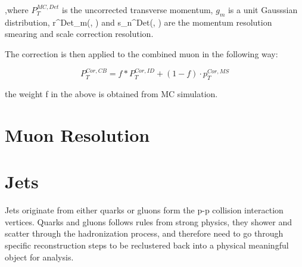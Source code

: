 ,where $P_{T}^{MC, Det}$ is the uncorrected transverse momentum, $g_m$ is a unit Gausssian distribution, \delta r^{Det}_{m}(\eta, \phi) and s_{n}^{Det}(\eta, \phi) are the momentum resolution smearing and scale correction resolution. 

The correction is then applied to the combined muon in the following way:

\[ P_{T}^{Cor, CB} = f *P_{T}^{Cor, ID}+ (1-f) \cdot p_{T}^{Cor, MS}\]

the weight f in the above is obtained from MC simulation. 

\section{Muon Resolution}





%
%
%
%
%
%

\section{Jets}
Jets originate from either quarks or gluons form the p-p collision interaction vertices. Quarks and gluons follows rules from strong physics, they shower and scatter through the hadronization process, and therefore need to go through specific reconstruction steps to be reclustered back into a physical meaningful object for analysis. 

